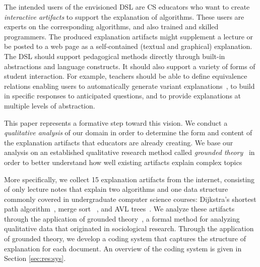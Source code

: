 \documentclass[sigconf]{acmart}
\begin{document}
The intended users of the envisioned DSL are CS educators who want to create
\emph{interactive artifacts} to support the explanation of algorithms. These
users are experts on the corresponding algorithms, and also trained and skilled
programmers. The produced explanation artifacts might supplement a lecture or
be posted to a web page as a self-contained (textual and graphical)
explanation.
%
The DSL should support pedagogical methods directly through built-in
abstractions and language constructs. It should also support a variety of forms
of student interaction. For example, teachers should be able to define
equivalence relations enabling users to automatically generate variant
explanations~\cite{EW13jvlc}, to build in specific responses to anticipated
questions, and to provide explanations at multiple levels of abstraction.


This paper represents a formative step toward this vision. We conduct a
\emph{qualitative analysis} of our domain in order to determine the form and
content of the explanation artifacts that educators are already creating.
%
We base our analysis on an established qualitative research method called
\emph{grounded theory}~\cite{Strauss67discoveryof} in order to better understand how well existing artifacts
explain complex topics


More specifically, we collect 15 explanation artifacts from the internet,
consisting of only lecture notes that explain two algorithms and one
data structure commonly covered in undergraduate computer science courses:
Dijkstra's shortest path algorithm~\cite[pp.~137--142]{KT06}, merge sort
~\cite[210--214]{KT06}, and AVL trees~\cite[pp.~458--475]{KnuthArt3}.
%
We analyze these artifacts through the application of grounded
theory~\cite{Strauss67discoveryof}, a formal method for analyzing qualitative
data that originated in sociological research. Through the application of
grounded theory, we develop a coding system that captures the structure of
explanation for each document. An overview of the coding system is given in
Section \ref{sec:res:sys}.

\end{document}

